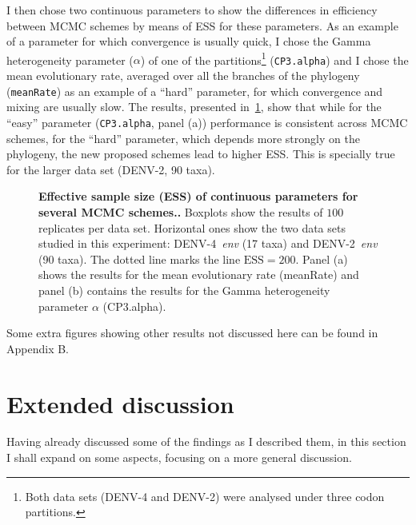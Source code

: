 I then chose two continuous parameters to show the differences in efficiency between MCMC schemes by means of ESS for these parameters.
As an example of a parameter for which convergence is usually quick, I chose the Gamma heterogeneity parameter ($\alpha$) of one of the partitions\footnote{Both data sets (DENV-4 and DENV-2) were analysed under three codon partitions.} (\verb|CP3.alpha|) and I chose the mean evolutionary rate, averaged over all the branches of the phylogeny (\verb|meanRate|) as an example of a ``hard'' parameter, for which convergence and mixing are usually slow. 
The results, presented in~\ref{fig:continuous_ESS}, show that while for the ``easy'' parameter (\verb|CP3.alpha|, panel (a)) performance is consistent across MCMC schemes, for the ``hard'' parameter, which depends more strongly on the phylogeny, the new proposed schemes lead to higher ESS.
This is specially true for the larger data set (DENV-2, 90 taxa).
\begin{figure}[!ht]
\begin{center}
\end{center}
 \caption[Effective sample size (ESS) of continuous parameters for several MCMC schemes.]{\textbf{Effective sample size (ESS) of continuous parameters for several MCMC schemes..}
  Boxplots show the results of $100$ replicates per data set.
  Horizontal ones show the two data sets studied in this experiment: DENV-4~\textit{env} (17 taxa) and DENV-2~\textit{env} (90 taxa).
  The dotted line marks the line $\text{ESS} = 200$.
  Panel (a) shows the results for the mean evolutionary rate (meanRate) and panel (b) contains the results for the Gamma heterogeneity parameter $\alpha$ (CP3.alpha).
  }
 \label{fig:continuous_ESS}
\end{figure}

Some extra figures showing other results not discussed here can be found in Appendix B.

\section{Extended discussion}

Having already discussed some of the findings as I described them, in this section I shall expand on some aspects, focusing on a more general discussion.

